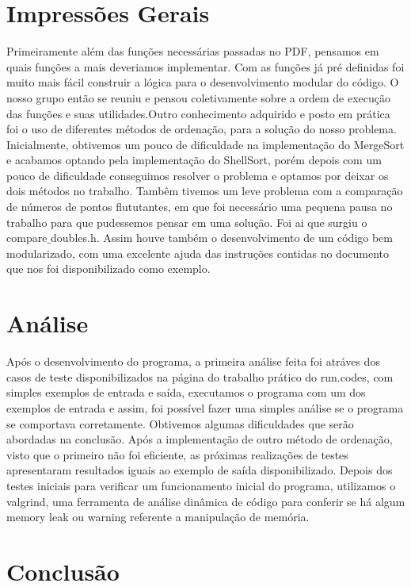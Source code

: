 \documentclass{article}
\begin{document}
\clearpage


\section{Impressões Gerais}

Primeiramente além das funções necessárias passadas no PDF, pensamos em quais funções a mais
deveriamos implementar. Com as funções já pré definidas foi muito mais fácil construir 
a lógica para o desenvolvimento modular do código. O nosso grupo então se
reuniu e pensou coletivamente sobre a ordem de execução das funções e suas 
utilidades.Outro conhecimento adquirido e posto em prática foi o uso de 
diferentes métodos de ordenação, para a solução do nosso problema.
Inicialmente, obtivemos um pouco de dificuldade na implementação do MergeSort e acabamos optando
pela implementação do ShellSort, porém depois com um pouco de dificuldade conseguimos resolver o problema
e optamos por deixar os dois métodos no trabalho.
Tambêm tivemos um leve problema com a comparação de números de pontos flututantes, em que foi necessário uma pequena
pausa no trabalho para que pudessemos pensar em uma solução. Foi ai que surgiu o compare$\_$doubles.h.
Assim houve também o desenvolvimento de um código bem modularizado, 
com uma excelente ajuda das instruções contidas no documento que nos foi disponibilizado como exemplo.

\section{Análise}

Após o desenvolvimento do programa, a primeira análise feita 
foi atráves dos casos de teste disponibilizados na página do 
trabalho prático do run.codes, com simples exemplos de entrada
e saída, executamos o programa com um dos exemplos de entrada
e assim, foi possível fazer uma simples análise se o programa
se comportava corretamente. Obtivemos algumas dificuldades
que serão abordadas na conclusão. Após a implementação
de outro método de ordenação, visto que o primeiro não
foi eficiente, as próximas realizações de testes apresentaram 
resultados iguais ao exemplo de saída disponibilizado.
Depois dos testes iniciais para verificar um funcionamento 
inicial do programa, utilizamos o valgrind, uma ferramenta 
de análise dinâmica de código para conferir se há algum memory 
leak ou warning referente a manipulação de memória.


\section{Conclusão}
\end{document}

